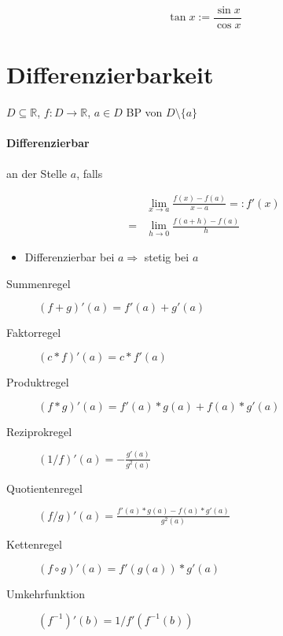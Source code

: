 $$\tan x := \frac{\sin x}{\cos x}$$

\section{Differenzierbarkeit}

$D \subseteq \mathbb{R}$, $f: D \rightarrow \mathbb{R}$, $a \in D$ BP von $D \setminus \{a\}$

\paragraph{Differenzierbar}
an der Stelle $a$, falls

\begin{align*}
    & \lim_{x \rightarrow a} \frac{f(x) - f(a)}{x - a} =: f'(x) \\
  = & \lim_{h \rightarrow 0} \frac{f(a + h) - f(a)}{h}
\end{align*}

\begin{itemize}
  \item Differenzierbar bei $a \Rightarrow$ stetig bei $a$
\end{itemize}

\begin{description}
  \item [Summenregel]
        $(f + g)'(a) = f'(a) + g'(a)$

  \item [Faktorregel]
        $(c * f)'(a) = c * f'(a)$

  \item [Produktregel]
        $(f * g)'(a) = f'(a) * g(a) + f(a) * g'(a)$

  \item [Reziprokregel]
        $(1/f)'(a) = - \frac{g'(a)}{g^2(a)}$

  \item [Quotientenregel]
        $(f/g)'(a) = \frac{f'(a) * g(a) - f(a) * g'(a)}{g^2(a)}$

  \item [Kettenregel]
        $(f \circ g)'(a) = f'(g(a)) * g'(a)$

  \item [Umkehrfunktion]
        $(f^{-1})'(b) = 1 / f'(f^{-1}(b))$
\end{description}

